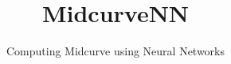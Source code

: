 \documentclass[xcolor=dvipsnames,compress,t,pdf,9pt]{beamer}
\title{MidcurveNN}
\subtitle[]{Computing Midcurve using Neural Networks}
\begin{document}
	\begin{frame}
	\titlepage
	\end{frame}
	
	

	
\end{document}

